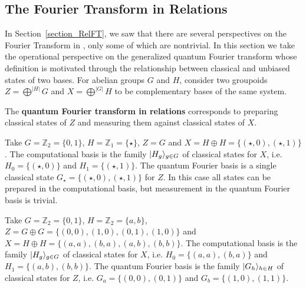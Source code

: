 \subsection{The Fourier Transform in Relations}
\label{sec:RelFT}

In Section~\ref{section_RelFT}, we saw that there are several perspectives on the Fourier Transform in , only some of which are nontrivial. In this section we take the operational perspective on the generalized quantum Fourier transform whose definition is motivated through the relationship between classical and unbiased states of two bases.  For abelian groups $G$ and $H$, consider two groupoids $Z=\bigoplus^{|H|}G$ and $X=\bigoplus^{|G|}H$ to be complementary bases of the same system.

\begin{defn}
\label{def:FTRel}
The \textbf{quantum Fourier transform in relations} corresponds to preparing classical states of $Z$ and measuring them against classical states of $X$.
\end{defn}

\begin{example}
Take $G=\mathbb{Z}_2=\{0,1\}$, $H=\mathbb{Z}_1=\{\star\}$, $Z = G$ and $X=H\oplus H = \{ (\star,0),(\star,1) \}$. The computational basis is the family $| H_g \rangle_{g\in G}$ of classical states for $X$, i.e. $H_0 = \{(\star,0)\}$ and $H_1 = \{(\star,1)\}$. The quantum Fourier basis is a single classical state $G_\star = \{(\star,0), (\star,1)\}$ for $Z$. In this case all states can be prepared in the computational basis, but  measurement in the quantum Fourier basis is trivial.
\end{example}

\begin{example}
Take $G=\mathbb{Z}_2=\{0,1\}$, $H=\mathbb{Z}_2=\{a,b\}$, $Z = G \oplus G = \{ (0,0),(1,0),(0,1),(1,0)\}$ and $X= H \oplus H = \{ (a,a), (b,a), (a,b), (b,b) \}$. The computational basis is the family $| H_g \rangle_{g \in G}$ of classical states for $X$, i.e. $H_0 = \{(a,a),(b,a)\}$ and $H_1 = \{(a,b),(b,b)\}$. The quantum Fourier basis is the family $| G_h \rangle_{h\in H}$ of classical states for $Z$, i.e. $G_a = \{(0,0),(0,1)\}$ and $G_b = \{(1,0),(1,1)\}$.
\end{example}

